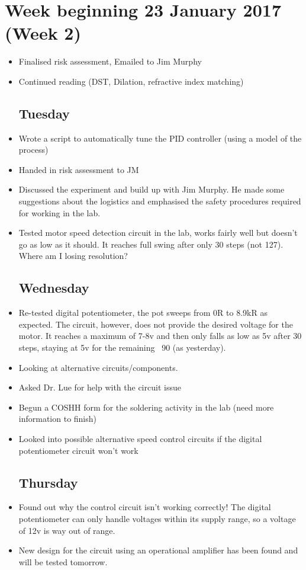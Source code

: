 \documentclass[a4]{report}
\begin{document}
	\section{Week beginning 23 January 2017 (Week 2)}
	\begin{itemize}
		\subsection*{Monday}
		\item Finalised risk assessment, Emailed to Jim Murphy
		\item Continued reading (DST, Dilation, refractive index matching)
		\subsection*{Tuesday}
		\item Wrote a script to automatically tune the PID controller (using a model of the process)
		\item Handed in risk assessment to JM
		\item Discussed the experiment and build up with Jim Murphy. He made some suggestions about the logistics and emphasised the safety procedures required for working in the lab.
		\item Tested motor speed detection circuit in the lab, works fairly well but doesn't go as low as it should. It reaches full swing after only 30 steps (not 127). Where am I losing resolution?
		\subsection*{Wednesday}
		\item Re-tested digital potentiometer, the pot sweeps from 0R to 8.9kR as expected. The circuit, however, does not provide the desired voltage for the motor. It reaches a maximum of 7-8v and then only falls as low as 5v after 30 steps, staying at 5v for the remaining ~90 (as yesterday).
		\item Looking at alternative circuits/components.
		\item Asked Dr. Lue for help with the circuit issue
		\item Begun a COSHH form for the soldering activity in the lab (need more information to finish)
		\item Looked into possible alternative speed control circuits if the digital potentiometer circuit won't work
		\subsection*{Thursday}
		\item Found out why the control circuit isn't working correctly! The digital potentiometer can only handle voltages within its supply range, so a voltage of 12v is way out of range.
		\item New design for the circuit using an operational amplifier has been found and will be tested tomorrow.

\end{itemize}
\end{document}
